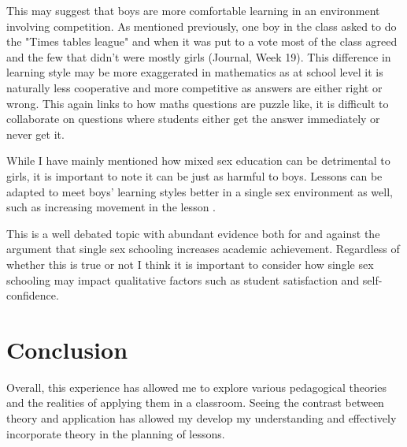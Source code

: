 \documentclass[11pt, a4paper, notitlepage]{article}
\begin{document}
This may suggest that boys are more comfortable learning in an environment involving competition. As mentioned previously, one boy in the class asked to do the "Times tables league" and when it was put to a vote most of the class agreed and the few that didn't were mostly girls (Journal, Week 19). This difference in learning style may be more exaggerated in mathematics as at school level it is naturally less cooperative and more competitive as answers are either right or wrong. This again links to how maths questions are puzzle like, it is difficult to collaborate on questions where students either get the answer immediately or never get it.
\par
While I have mainly mentioned how mixed sex education can be detrimental to girls, it is important to note it can be just as harmful to boys. Lessons can be adapted to meet boys' learning styles better in a single sex environment as well, such as increasing movement in the lesson \cite{Hughes:2006}.
\par
This is a well debated topic with abundant evidence both for and against the argument that single sex schooling increases academic achievement. Regardless of whether this is true or not I think it is important to consider how single sex schooling may impact qualitative factors such as student satisfaction and self-confidence.


\section*{Conclusion}
Overall, this experience has allowed me to explore various pedagogical theories and the realities of applying them in a classroom. Seeing the contrast between theory and application has allowed my develop my understanding and effectively incorporate theory in the planning of lessons. 



\end{document}
